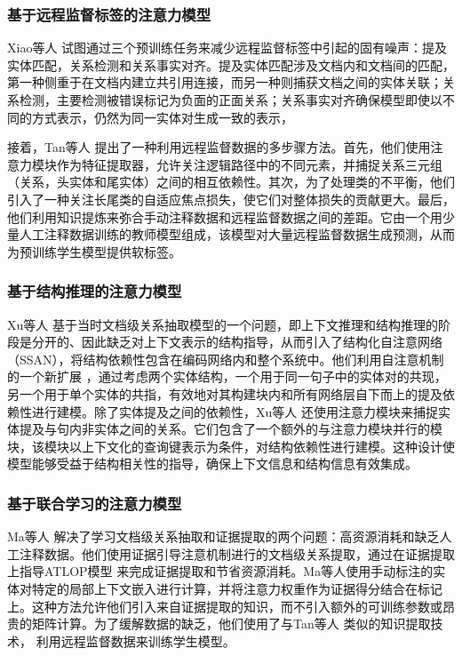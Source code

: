 \documentclass[bachelor]{thesis-uestc}
\begin{document}
\subsubsection{基于远程监督标签的注意力模型}

Xiao等人 \cite{xiao-etal-2020-denoising} 试图通过三个预训练任务来减少远程监督标签中引起的固有噪声：提及实体匹配，关系检测和关系事实对齐。提及实体匹配涉及文档内和文档间的匹配，第一种侧重于在文档内建立共引用连接，而另一种则捕获文档之间的实体关联；关系检测，主要检测被错误标记为负面的正面关系；关系事实对齐确保模型即使以不同的方式表示，仍然为同一实体对生成一致的表示， \par

接着，Tan等人 \cite{tan-etal-2022-document} 提出了一种利用远程监督数据的多步骤方法。首先，他们使用注意力模块作为特征提取器，允许关注逻辑路径中的不同元素，并捕捉关系三元组（关系，头实体和尾实体）之间的相互依赖性。其次，为了处理类的不平衡，他们引入了一种关注长尾类的自适应焦点损失，使它们对整体损失的贡献更大。最后，他们利用知识提炼来弥合手动注释数据和远程监督数据之间的差距。它由一个用少量人工注释数据训练的教师模型组成，该模型对大量远程监督数据生成预测，从而为预训练学生模型提供软标签。

\subsubsection{基于结构推理的注意力模型}

Xu等人 \cite{Xu_Wang_Lyu_Zhu_Mao_2021} 基于当时文档级关系抽取模型的一个问题，即上下文推理和结构推理的阶段是分开的、因此缺乏对上下文表示的结构指导，从而引入了结构化自注意网络（SSAN），将结构依赖性包含在编码网络内和整个系统中。他们利用自注意机制的一个新扩展 \cite{Vaswani2017AttentionIA}，通过考虑两个实体结构，一个用于同一句子中的实体对的共现，另一个用于单个实体的共指，有效地对其构建块内和所有网络层自下而上的提及依赖性进行建模。除了实体提及之间的依赖性，Xu等人 \cite{Xu_Wang_Lyu_Zhu_Mao_2021}还使用注意力模块来捕捉实体提及与句内非实体之间的关系。它们包含了一个额外的与注意力模块并行的模块，该模块以上下文化的查询键表示为条件，对结构依赖性进行建模。这种设计使模型能够受益于结构相关性的指导，确保上下文信息和结构信息有效集成。

\subsubsection{基于联合学习的注意力模型}
Ma等人 \cite{ma-etal-2023-DREEAM} 解决了学习文档级关系抽取和证据提取的两个问题：高资源消耗和缺乏人工注释数据。他们使用证据引导注意机制进行的文档级关系提取，通过在证据提取上指导ATLOP模型 \cite{zhou2021document}来完成证据提取和节省资源消耗。Ma等人使用手动标注的实体对特定的局部上下文嵌入进行计算，并将注意力权重作为证据得分结合在标记上。这种方法允许他们引入来自证据提取的知识，而不引入额外的可训练参数或昂贵的矩阵计算。为了缓解数据的缺乏，他们使用了与Tan等人 \cite{tan-etal-2022-document} 类似的知识提取技术， 利用远程监督数据来训练学生模型。
\end{document}
